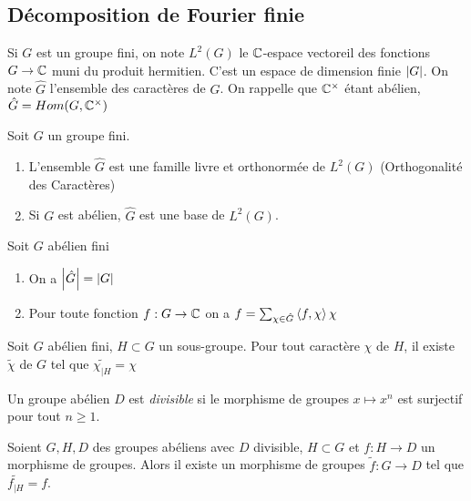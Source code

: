 \documentclass{cours}
\begin{document}
\subsection{Décomposition de Fourier finie}
\begin{definition}
    Si $G$ est un groupe fini, on note $L^{2}(G)$ le $\mathbb{C}$-espace vectoreil des fonctions $G \rightarrow \mathbb{C}$ muni du produit hermitien. C'est un espace de dimension finie $\left|G\right|$. On note $\hat{G}$ l'ensemble des caractères de $G$. On rappelle que $\mathbb{C}^{\times}$ étant abélien, $\hat{G} = Hom(G, \mathbb{C}^{\times})$
\end{definition}

\begin{theorem}
    Soit $G$ un groupe fini. 
    \begin{enumerate}
        \item L'ensemble $\hat{G}$ est une famille livre et orthonormée de $L^{2}(G)$ (Orthogonalité des Caractères)
        \item Si $G$ est abélien, $\hat{G}$ est une base de $L^{2}(G)$.
    \end{enumerate}    
\end{theorem}

\begin{corollary}
    Soit $G$ abélien fini
    \begin{enumerate}
        \item On a $\left|\hat{G}\right| = \left|G\right|$
        \item Pour toute fonction $f : G \rightarrow \mathbb{C}$ on a $f = \sum_{\chi \in \hat{G}} \left\langle f, \chi \right\rangle \chi$
    \end{enumerate}
\end{corollary}

\begin{proposition}
    Soit $G$ abélien fini, $H \subset G$ un sous-groupe. Pour tout caractère $\chi$ de $H$, il existe $\tilde{\chi}$ de $G$ tel que $\tilde{\chi_{\mid H}} = \chi$ 
\end{proposition}

\begin{definition}
    Un groupe abélien $D$ est \emph{divisible} si le morphisme de groupes $x \mapsto x^{n}$ est surjectif pour tout $n \geq 1$.
\end{definition}

\begin{proposition}
    Soient $G, H, D$ des groupes abéliens avec $D$ divisible, $H \subset G$ et $f : H \rightarrow D$ un morphisme de groupes. Alors il existe un morphisme de groupes $\tilde{f} : G \rightarrow D$ tel que $\tilde{f_{\mid H}} = f$.
\end{proposition}
\end{document}
